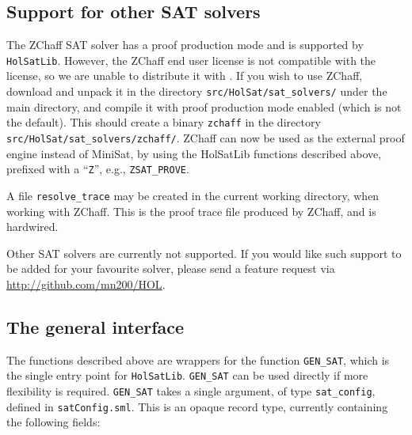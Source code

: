 \subsection{Support for other SAT solvers}\label{subsec:hs_zchaff}

The ZChaff SAT solver has a proof production mode and is supported by {\tt{HolSatLib}}. However, the ZChaff end user license is not compatible with the \HOL{} license, so we are unable to distribute it with \HOL{}. If you wish to use ZChaff, download and unpack it in the directory {\tt src/HolSat/sat\_solvers/} under the main \HOL{} directory, and compile it with proof production mode enabled (which is not the default). This should create a binary {\tt zchaff} in the directory {\tt src/HolSat/sat\_solvers/zchaff/}. ZChaff can now be used as the external proof engine instead of MiniSat, by using the HolSatLib functions described above, prefixed with a ``{\tt Z}'', e.g., {\tt ZSAT\_PROVE}.

A file \texttt{resolve\_trace} may be created in the current working directory, when working with ZChaff. This is the proof trace file produced by ZChaff, and is hardwired.

Other SAT solvers are currently not supported. If you would like such support to be added for your favourite solver, please send a feature request via \url{http://github.com/mn200/HOL}.

\subsection{The general interface}

The functions described above are wrappers for the function \texttt{GEN\_SAT}, which is the single entry point for {\tt{HolSatLib}}. \texttt{GEN\_SAT} can be used directly if more flexibility is required. \texttt{GEN\_SAT} takes a single argument, of type \texttt{sat\_config}, defined in \texttt{satConfig.sml}. This is an opaque record type, currently containing the following fields:

